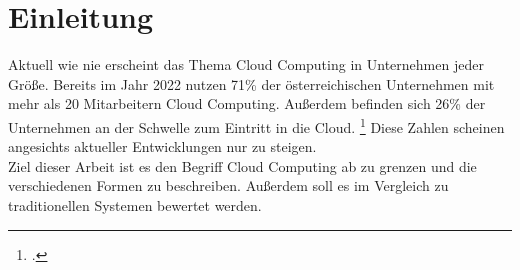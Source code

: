 \chapter{Einleitung} %
\label{cha:Einleitung}

Aktuell wie nie erscheint das Thema Cloud Computing in Unternehmen jeder Größe. Bereits im Jahr 2022 nutzen 71\% der österreichischen Unternehmen mit mehr als 20 Mitarbeitern Cloud Computing. Außerdem befinden sich 26\% der Unternehmen an der Schwelle zum Eintritt in die Cloud. \footcite[Vgl.][S. 3]{KPMGAGWirtschaftsprufungsgesellschaft.25.06.2022} Diese Zahlen scheinen angesichts aktueller Entwicklungen nur zu steigen. \\
Ziel dieser Arbeit ist es den Begriff Cloud Computing ab zu grenzen und die verschiedenen Formen zu beschreiben. Außerdem soll es im Vergleich zu traditionellen Systemen bewertet werden.\\

